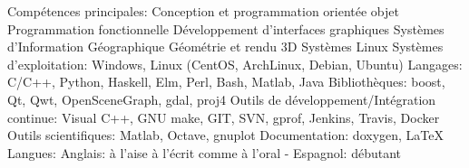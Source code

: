 \begin{cvskills}
  \cvskill
    {Compétences principales:}
 	{
		Conception et programmation orientée objet \newline
        Programmation fonctionnelle \newline
 	 	Développement d'interfaces graphiques \newline
 	 	Systèmes d'Information Géographique \newline
	 	Géométrie et rendu 3D \newline
	 	Systèmes Linux
	}
  \cvskill
    {Systèmes d'exploitation:}
 	{Windows, Linux (CentOS, ArchLinux, Debian, Ubuntu)}
  \cvskill
    {Langages:}
 	{C/C++, Python, Haskell, Elm, Perl, Bash, Matlab, Java}
  \cvskill
    {Bibliothèques:}
 	{boost, Qt, Qwt, OpenSceneGraph, gdal, proj4}
  \cvskill
	{Outils de développement/Intégration continue:}
	{Visual C++, GNU make, GIT, SVN, gprof, Jenkins, Travis, Docker}
  \cvskill
	{Outils scientifiques:}
	{Matlab, Octave, gnuplot}
  \cvskill
	{Documentation:}
	{doxygen, \LaTeX}
  \cvskill
    {Langues:}
 	{Anglais: à l'aise à l'écrit comme à l'oral - Espagnol: débutant}
\end{cvskills}

